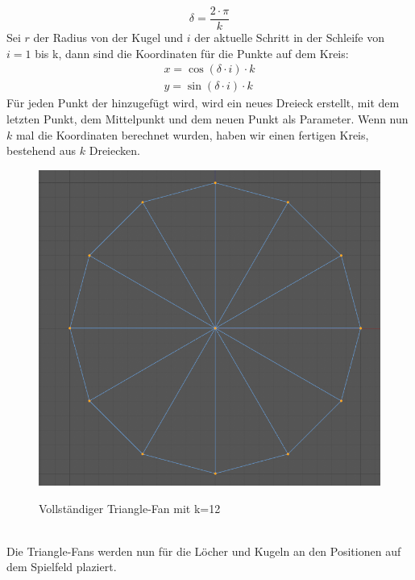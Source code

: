 	\begin{equation}\label{eq:delta}
		\delta =\frac{2 \cdot \pi}{k} 
	\end{equation}
	Sei $r$ der  Radius von der Kugel und $i$ der aktuelle Schritt in der Schleife von $i=1$ bis k, dann sind die Koordinaten für die Punkte auf dem Kreis:
	\begin{equation}\label{eq:circleCoord}
		\begin{aligned}
			x = \cos (\delta \cdot i) \cdot k\\
			y = \sin (\delta \cdot i) \cdot k
		\end{aligned}
	\end{equation}
	Für jeden Punkt der hinzugefügt wird, wird ein neues Dreieck erstellt, mit dem letzten Punkt, dem Mittelpunkt und dem neuen Punkt als Parameter.
	Wenn  nun $k$ mal die Koordinaten berechnet wurden, haben wir einen fertigen Kreis, bestehend aus $k$ Dreiecken.
		\begin{figure}[h]
		\centering
		\caption{Vollständiger Triangle-Fan mit k=12}
		\includegraphics[width=\textwidth/6]{bilder/k12kreis.png} \\
	\end{figure} \\
	Die Triangle-Fans werden nun für die Löcher und Kugeln an den Positionen auf dem Spielfeld plaziert.
